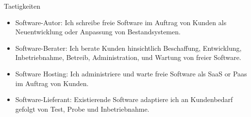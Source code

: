 
\begin{frame}{Taetigkeiten}
  \begin{itemize}
  \item Software-Autor: Ich schreibe freie Software im Auftrag von Kunden als Neuentwicklung oder Anpassung von Bestandsystemen.
  \item Software-Berater: Ich berate Kunden hinsichtlich Beschaffung, Entwicklung, Inbetriebnahme, Betreib, Administration, und Wartung von freier Software.
  \item Software Hosting: Ich administriere und warte freie Software als SaaS or Paas im Auftrag von Kunden.
  \item Software-Lieferant: Existierende Software adaptiere ich an Kundenbedarf gefolgt von Test, Probe und Inbetriebnahme.
  \end{itemize}
\end{frame}
